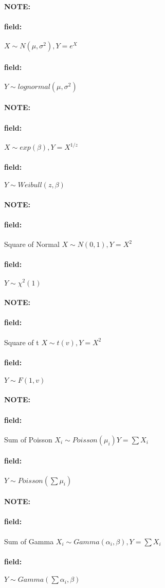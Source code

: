 \documentclass[12pt]{article}
\newenvironment{note}{\paragraph{NOTE:}}{}
\newenvironment{field}{\paragraph{field:}}{}
\begin{document}
\begin{note}
  \begin{field}
    $X \sim N(\mu,\sigma^2), Y = e^X$
  \end{field}
  \begin{field}
    $Y \sim lognormal(\mu,\sigma^2)$
  \end{field}
\end{note}

\begin{note}
  \begin{field}
    $X \sim exp(\beta), Y = X^{1/z}$
  \end{field}
  \begin{field}
    $Y \sim Weibull(z,\beta)$
  \end{field}
\end{note}

\begin{note}
  \begin{field}
    Square of Normal
    $X \sim N(0,1), Y = X^2$
  \end{field}
  \begin{field}
    $Y \sim \chi^2(1)$
  \end{field}
\end{note}

\begin{note}
  \begin{field}
    Square of t
    $X \sim t(v), Y = X^2$
  \end{field}
  \begin{field}
    $Y \sim F(1,v)$
  \end{field}
\end{note}

\begin{note}
  \begin{field}
    Sum of Poisson
    $X_i \sim Poisson(\mu_i) Y = \sum X_i$
  \end{field}
  \begin{field}
    $Y \sim Poisson(\sum \mu_i)$
  \end{field}
\end{note}

\begin{note}
  \begin{field}
    Sum of Gamma
    $X_i \sim Gamma(\alpha_i, \beta), Y = \sum X_i$
  \end{field}
  \begin{field}
    $Y \sim Gamma(\sum \alpha_i, \beta)$
  \end{field}
\end{note}
\end{document}
